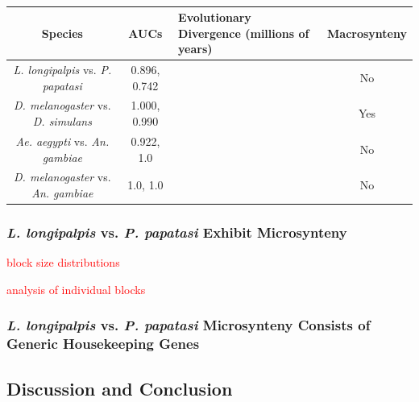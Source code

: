 \begin{table}[H]
  \centering
  \begin{tabular}{|c|c|p{2.8cm}|c|} \hline
  Species & AUCs & Evolutionary Divergence (millions of years) & Macrosynteny \\ \hline
  \emph{L. longipalpis} vs. \emph{P. papatasi} & 0.896, 0.742 & & No \\ \hline
  \emph{D. melanogaster} vs. \emph{D. simulans} & 1.000, 0.990 & & Yes \\ \hline
  \emph{Ae. aegypti} vs. \emph{An. gambiae} & 0.922, 1.0 & & No \\ \hline
  \emph{D. melanogaster} vs. \emph{An. gambiae} & 1.0, 1.0 & & No \\ \hline
  \end{tabular}
  \caption{}
  \label{tab:synteny-species}
\end{table}

\subsubsection{\emph{L. longipalpis} vs. \emph{P. papatasi} Exhibit Microsynteny}

\textcolor{red}{block size distributions}

\textcolor{red}{analysis of individual blocks}

\subsubsection{\emph{L. longipalpis} vs. \emph{P. papatasi} Microsynteny Consists of Generic Housekeeping Genes}

\subsection{Discussion and Conclusion}